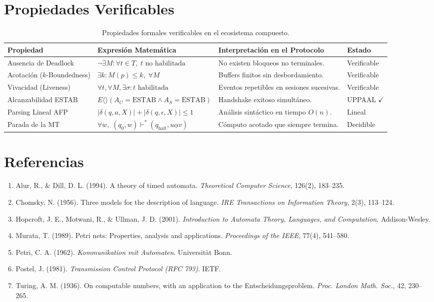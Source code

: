 \documentclass[12pt,letterpaper]{article}
\begin{document}
\section{Propiedades Verificables}
\begin{table}[h!]
\centering
\small
\begin{tabularx}{\textwidth}{lXXl}
\toprule
\textbf{Propiedad} & \textbf{Expresión Matemática} & \textbf{Interpretación en el Protocolo} & \textbf{Estado} \\
\midrule
Ausencia de Deadlock & $\neg \exists M : \forall t \in T, \; t \text{ no habilitada}$ & No existen bloqueos no terminales. & Verificable \\
Acotación ($k$-Boundedness) & $\exists k : M(p) \le k, \; \forall M$ & Buffers finitos sin desbordamiento. & Verificable \\
Vivacidad (Liveness) & $\forall t, \forall M, \exists \sigma : t \text{ habilitada}$ & Eventos repetibles en sesiones sucesivas. & Verificable \\
Alcanzabilidad ESTAB & $E\langle\rangle(A_C = \text{ESTAB} \land A_S = \text{ESTAB})$ & Handshake exitoso simultáneo. & UPPAAL $\checkmark$ \\
Parsing Lineal AFP & $|\delta(q, a, X)| + |\delta(q, \epsilon, X)| \le 1$ & Análisis sintáctico en tiempo $O(n)$. & Lineal \\
Parada de la MT & $\forall w, \; (q_0, w) \vdash^* (q_{\text{halt}}, u \underline{\alpha} v)$ & Cómputo acotado que siempre termina. & Decidible \\
\bottomrule
\end{tabularx}
\caption{Propiedades formales verificables en el ecosistema compuesto.}
\end{table}

\section{Referencias}
\begin{enumerate}
    \item Alur, R., \& Dill, D. L. (1994). A theory of timed automata. \textit{Theoretical Computer Science}, 126(2), 183--235.
    \item Chomsky, N. (1956). Three models for the description of language. \textit{IRE Transactions on Information Theory}, 2(3), 113--124.
    \item Hopcroft, J. E., Motwani, R., \& Ullman, J. D. (2001). \textit{Introduction to Automata Theory, Languages, and Computation}. Addison-Wesley.
    \item Murata, T. (1989). Petri nets: Properties, analysis and applications. \textit{Proceedings of the IEEE}, 77(4), 541--580.
    \item Petri, C. A. (1962). \textit{Kommunikation mit Automaten}. Universität Bonn.
    \item Postel, J. (1981). \textit{Transmission Control Protocol (RFC 793)}. IETF.
    \item Turing, A. M. (1936). On computable numbers, with an application to the Entscheidungsproblem. \textit{Proc. London Math. Soc.}, 42, 230--265.
\end{enumerate}
\end{document}
